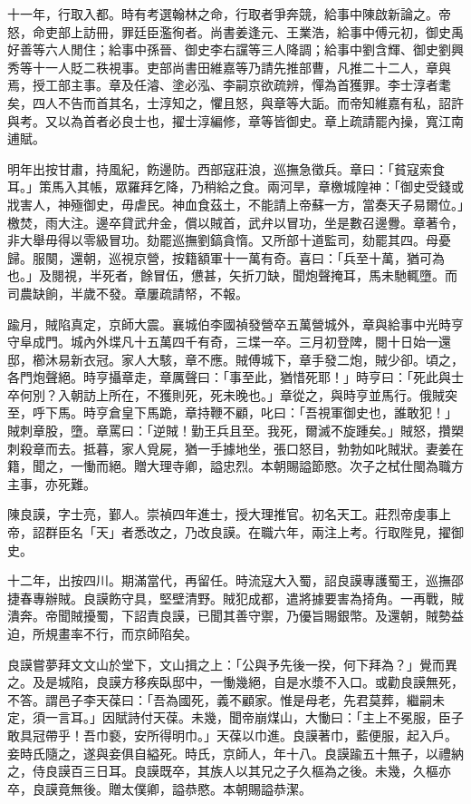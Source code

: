 \begin{pinyinscope}
十一年，行取入都。時有考選翰林之命，行取者爭奔競，給事中陳啟新論之。帝怒，命吏部上訪冊，罪廷臣濫徇者。尚書姜逢元、王業浩，給事中傅元初，御史禹好善等六人閒住；給事中孫晉、御史李右讜等三人降調；給事中劉含輝、御史劉興秀等十一人貶二秩視事。吏部尚書田維嘉等乃請先推部曹，凡推二十二人，章與焉，授工部主事。章及任濬、塗必泓、李嗣京欲疏辨，憚為首獲罪。李士淳者耄矣，四人不告而首其名，士淳知之，懼且怒，與章等大詬。而帝知維嘉有私，詔許與考。又以為首者必良士也，擢士淳編修，章等皆御史。章上疏請罷內操，寬江南逋賦。

明年出按甘肅，持風紀，飭邊防。西部寇莊浪，巡撫急徵兵。章曰：「貧寇索食耳。」策馬入其帳，眾羅拜乞降，乃稍給之食。兩河旱，章檄城隍神：「御史受錢或戕害人，神殛御史，毋虐民。神血食茲土，不能請上帝蘇一方，當奏天子易爾位。」檄焚，雨大注。邊卒貸武弁金，償以賊首，武弁以冒功，坐是數召邊釁。章著令，非大舉毋得以零級冒功。劾罷巡撫劉鎬貪惰。又所部十道監司，劾罷其四。母憂歸。服闋，還朝，巡視京營，按籍額軍十一萬有奇。喜曰：「兵至十萬，猶可為也。」及閱視，半死者，餘冒伍，憊甚，矢折刀缺，聞炮聲掩耳，馬未馳輒墮。而司農缺餉，半歲不發。章屢疏請帑，不報。

踰月，賊陷真定，京師大震。襄城伯李國禎發營卒五萬營城外，章與給事中光時亨守阜成門。城內外堞凡十五萬四千有奇，三堞一卒。三月初登陴，閱十日始一還邸，櫛沐易新衣冠。家人大駭，章不應。賊傅城下，章手發二炮，賊少卻。頃之，各門炮聲絕。時亨攝章走，章厲聲曰：「事至此，猶惜死耶！」時亨曰：「死此與士卒何別？入朝訪上所在，不獲則死，死未晚也。」章從之，與時亨並馬行。俄賊突至，呼下馬。時亨倉皇下馬跪，章持鞭不顧，叱曰：「吾視軍御史也，誰敢犯！」賊刺章股，墮。章罵曰：「逆賊！勤王兵且至。我死，爾滅不旋踵矣。」賊怒，攢槊刺殺章而去。抵暮，家人覓屍，猶一手據地坐，張口怒目，勃勃如叱賊狀。妻姜在籍，聞之，一慟而絕。贈大理寺卿，謚忠烈。本朝賜謚節愍。次子之栻仕閩為職方主事，亦死難。

陳良謨，字士亮，鄞人。崇禎四年進士，授大理推官。初名天工。莊烈帝虔事上帝，詔群臣名「天」者悉改之，乃改良謨。在職六年，兩注上考。行取陛見，擢御史。

十二年，出按四川。期滿當代，再留任。時流寇大入蜀，詔良謨專護蜀王，巡撫邵捷春專辦賊。良謨飭守具，堅壁清野。賊犯成都，遣將據要害為掎角。一再戰，賊潰奔。帝聞賊擾蜀，下詔責良謨，已聞其善守禦，乃優旨賜銀幣。及還朝，賊勢益迫，所規畫率不行，而京師陷矣。

良謨嘗夢拜文文山於堂下，文山揖之上：「公與予先後一揆，何下拜為？」覺而異之。及是城陷，良謨方移疾臥邸中，一慟幾絕，自是水漿不入口。或勸良謨無死，不答。謂邑子李天葆曰：「吾為國死，義不顧家。惟是母老，先君莫葬，繼嗣未定，須一言耳。」因賦詩付天葆。未幾，聞帝崩煤山，大慟曰：「主上不冕服，臣子敢具冠帶乎！吾巾褻，安所得明巾。」天葆以巾進。良謨著巾，藍便服，起入戶。妾時氏隨之，遂與妾俱自縊死。時氏，京師人，年十八。良謨踰五十無子，以禮納之，侍良謨百三日耳。良謨既卒，其族人以其兄之子久樞為之後。未幾，久樞亦卒，良謨竟無後。贈太僕卿，謚恭愍。本朝賜謚恭潔。


\end{pinyinscope}

